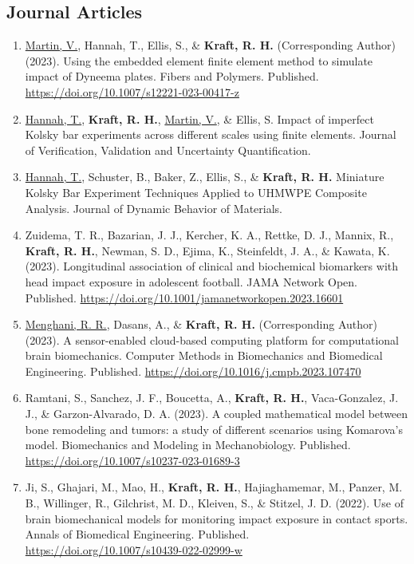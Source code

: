 \documentclass[a4paper,10pt]{article}
\begin{document}
    \subsection*{Journal Articles}
    \begin{enumerate}
     \item	\underline{Martin, V.}, Hannah, T., Ellis, S., \&
 \textbf{\textbf{Kraft,} R. H.} (Corresponding Author) (2023). Using the embedded element finite element method to simulate impact of Dyneema plates. Fibers and Polymers. Published. \url{https://doi.org/10.1007/s12221-023-00417-z}
 \item	\underline{Hannah, T.}, \textbf{\textbf{Kraft,} R. H.}, \underline{Martin, V.}, \&
 Ellis, S. Impact of imperfect Kolsky bar experiments across different scales using finite elements. Journal of Verification, Validation and Uncertainty Quantification.
 \item	\underline{Hannah, T.}, Schuster, B., Baker, Z., Ellis, S., \&
 \textbf{\textbf{Kraft,} R. H.} Miniature Kolsky Bar Experiment Techniques Applied to UHMWPE Composite Analysis. Journal of Dynamic Behavior of Materials.
 \item	Zuidema, T. R., Bazarian, J. J., Kercher, K. A., Rettke, D. J., Mannix, R., \textbf{\textbf{Kraft,} R. H.}, Newman, S. D., Ejima, K., Steinfeldt, J. A., \&
 Kawata, K. (2023). Longitudinal association of clinical and biochemical biomarkers with head impact exposure in adolescent football. JAMA Network Open. Published. \url{https://doi.org/10.1001/jamanetworkopen.2023.16601}
 \item	\underline{Menghani, R. R.}, Dasans, A., \&
 \textbf{\textbf{Kraft,} R. H.} (Corresponding Author) (2023). A sensor-enabled cloud-based computing platform for computational brain biomechanics. Computer Methods in Biomechanics and Biomedical Engineering. Published. \url{https://doi.org/10.1016/j.cmpb.2023.107470}
 \item	Ramtani, S., Sanchez, J. F., Boucetta, A., \textbf{\textbf{Kraft,} R. H.}, Vaca-Gonzalez, J. J., \&
 Garzon-Alvarado, D. A. (2023). A coupled mathematical model between bone remodeling and tumors: a study of different scenarios using Komarova's model. Biomechanics and Modeling in Mechanobiology. Published. \url{https://doi.org/10.1007/s10237-023-01689-3}
 \item	Ji, S., Ghajari, M., Mao, H., \textbf{\textbf{Kraft,} R. H.}, Hajiaghamemar, M., Panzer, M. B., Willinger, R., Gilchrist, M. D., Kleiven, S., \&
 Stitzel, J. D. (2022). Use of brain biomechanical models for monitoring impact exposure in contact sports. Annals of Biomedical Engineering. Published. \url{https://doi.org/10.1007/s10439-022-02999-w}

\end{enumerate}
\end{document}
